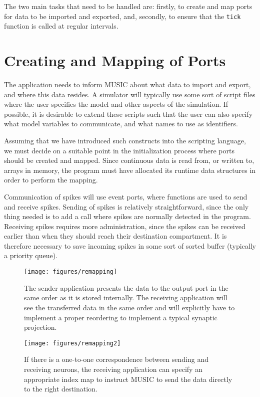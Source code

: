 \documentclass[a4paper,twoside]{report}
\begin{document}
The two main tasks that need to be handled are: firstly, to create and
map ports for data to be imported and exported, and, secondly, to
ensure that the \lstinline|tick| function is called at regular
intervals.


\section{Creating and Mapping of Ports}

The application needs to inform MUSIC about what data to import and
export, and where this data resides.  A simulator will typically use
some sort of script files where the user specifies the model and other
aspects of the simulation.  If possible, it is desirable to extend
these scripts such that the user can also specify what model variables
to communicate, and what names to use as identifiers.

Assuming that we have introduced such constructs into the scripting
language, we must decide on a suitable point in the initialization
process where ports should be created and mapped.  Since continuous
data is read from, or written to, arrays in memory, the program must
have allocated its runtime data structures in order to perform the
mapping.

Communication of spikes will use event ports, where functions are used
to send and receive spikes.  Sending of spikes is relatively
straightforward, since the only thing needed is to add a call where
spikes are normally detected in the program.  Receiving spikes
requires more administration, since the spikes can be received earlier
than when they should reach their destination compartment.  It is
therefore necessary to save incoming spikes in some sort of sorted
buffer (typically a priority queue).

\begin{figure}
  \begin{center}
    \begin{minipage}[t]{0.45\textwidth}
      \texttt{[image: figures/remapping]}
      \caption[Processing of incoming data]{\label{fig:remapping1}
        The sender application presents the data to the output port in
        the same order as it is stored internally.  The receiving
        application will see the transferred data in the same order
        and will explicitly have to implement a proper reordering to
        implement a typical synaptic projection.
      }
    \end{minipage}
    \hfill
    \begin{minipage}[t]{0.45\textwidth}
      \texttt{[image: figures/remapping2]}
      \caption[Remapping of data within MUSIC]{\label{fig:remapping2}
        If there is a one-to-one correspondence between sending and
        receiving neurons, the receiving application can specify an
        appropriate index map to instruct MUSIC to send the data
        directly to the right destination.
      }
    \end{minipage}
  \end{center}
\end{figure}
\end{document}
